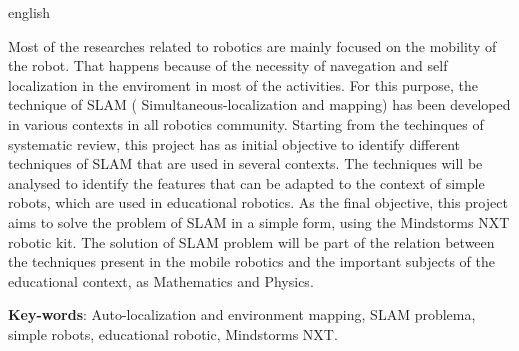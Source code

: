 \begin{resumo}[Abstract]
 \begin{otherlanguage*}{english}
   
   Most of the researches related to robotics are mainly  focused on the mobility of the robot. That happens because of the necessity of navegation and self localization in the enviroment in most of the activities. For this purpose, the technique of SLAM ( Simultaneous-localization and mapping) has been developed in various contexts in all robotics community. Starting from the techinques of systematic review, this project has as initial objective to identify different techniques of SLAM that are used in several contexts. The techniques will be analysed to identify  the features that can be adapted to the context of simple robots, which are used in educational robotics. As the final objective, this project aims to solve the problem of SLAM in a simple form, using the Mindstorms NXT robotic kit. The solution of SLAM problem will be part of the relation between the techniques present in the mobile robotics and the important subjects of the educational context, as Mathematics and Physics.

   \vspace{\onelineskip}
 
   \noindent 
   \textbf{Key-words}: Auto-localization and environment mapping, SLAM problema, simple robots, educational robotic, Mindstorms NXT.
 \end{otherlanguage*}
\end{resumo}
